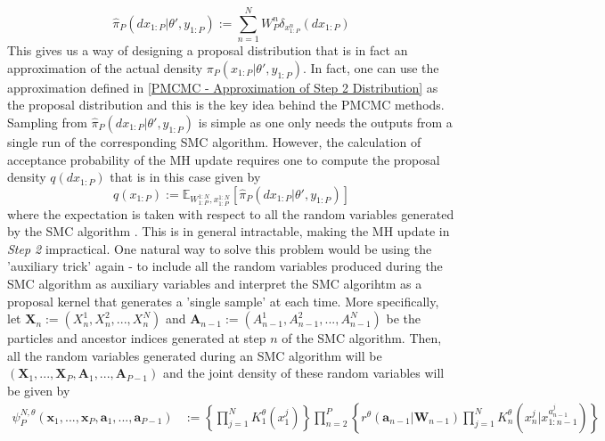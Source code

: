 \documentclass[12pt,a4paper]{article}
\begin{document}
\begin{equation}
    \label{PMCMC - Approximation of Step 2 Distribution}
    \hat{\pi}_P(dx_{1:P}|\theta',y_{1:P}):=\sum_{n=1}^{N} W_P^n \delta_{x_{1:P}^n}(dx_{1:P})
\end{equation}
This gives us a way of designing a proposal distribution that is in fact an approximation of the actual density $\pi_P(x_{1:P}|\theta',y_{1:P})$. In fact, one can use the approximation defined in \eqref{PMCMC - Approximation of Step 2 Distribution} as the proposal distribution and this is the key idea behind the PMCMC methods. Sampling from $\hat{\pi}_P(dx_{1:P}|\theta',y_{1:P})$ is simple as one only needs the outputs from a single run of the corresponding SMC algorithm. However, the calculation of acceptance probability of the MH update requires one to compute the proposal density $q(dx_{1:P})$ that is in this case given by 
\begin{equation}
    q(x_{1:P}) := \mathbb{E}_{W_{1:P}^{1:N},x_{1:P}^{1:N}}\left[\hat{\pi}_P(dx_{1:P}|\theta',y_{1:P})\right]
\end{equation}
where the expectation is taken with respect to all the random variables generated by the SMC algorithm \citep{andrieu2010particle}. This is in general intractable, making the MH update in \textit{Step 2} impractical. One natural way to solve this problem would be using the 'auxiliary trick' again - to include all the random variables produced during the SMC algorithm as auxiliary variables and interpret the SMC algorihtm as a proposal kernel that generates a 'single sample' at each time. More specifically, let $\mathbf{X}_n := \left(X_n^1,X_n^2,...,X_n^N\right)$ and $\mathbf{A}_{n-1}:=\left(A_{n-1}^1,A_{n-1}^2,...,A_{n-1}^N\right)$ be the particles and ancestor indices generated at step $n$ of the SMC algorithm. Then, all the random variables generated during an SMC algorithm will be $\left(\mathbf{X}_1,...,\mathbf{X}_P,\mathbf{A}_1,...,\mathbf{A}_{P-1}\right)$ and the joint density of these random variables will be given by 
\begin{equation}
    \label{JointDensity-of-SMC}
    \begin{split}
        \psi_P^{N,\theta}(\textbf{x}_1,...,\textbf{x}_P,\textbf{a}_1,...,\textbf{a}_{P-1}) & := \left\{\prod_{j=1}^{N}K_1^{\theta}\left(x_1^j\right)\right\}\prod_{n=2}^{P}\left\{r^{\theta}\left(\textbf{a}_{n-1}|\textbf{W}_{n-1}\right)\prod_{j=1}^{N}K_n^{\theta}\left(x_n^j|x_{1:n-1}^{a_{n-1}^j}\right)\right\}
    \end{split}
\end{equation}
\end{document}
